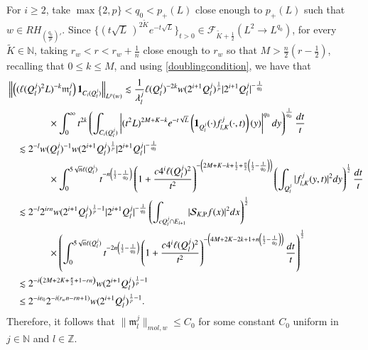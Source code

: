 \documentclass[11pt, a4paper,leqno]{amsart}
\newcommand{\mm}{\mathfrak{m}}
\renewcommand{\chi}{{\bf 1}}
\theoremstyle{plain}
\theoremstyle{definition}
\theoremstyle{remark}
\numberwithin{equation}{section}
\def \N{ \mathbb{N} }
\def \Z{ \mathbb{Z} }
\def \Scal{ \mathcal{S} }
\def \pp{ \mathrm{P} }
\begin{document}
For $i\geq 2$, take $\max\{2,p\}<q_0<p_+(L)$ close enough to $p_+(L)$ such that $w\in
RH_{\left(\frac{q_0}{p}\right)'}$. Since $\{(t\sqrt{L}\,)^{2\widetilde{K}}e^{-t\sqrt{L}}\}_{t>0}\in \mathcal{F}_{\widetilde{K}+\frac{1}{2}}(L^{2}\rightarrow L^{q_0})$, for every $\widetilde{K}\in \N$, taking $r_w<r<r_w+\frac{1}{n}$ close enough to $r_w$ so that $M>\frac{n}{2}\left(r-\frac{1}{2}\right)$, recalling that $0\leq k\leq M$, and using \eqref{doublingcondition}, we have that
 \begin{align*}
&\left\|\left((\ell(Q_l^j)^2L)^{-k}\mm_l^j\right)\chi_{C_i(Q_l^j)}
    \right\|_{L^p(w)}
 \lesssim \frac{1}{\lambda_l^j}\ell(Q_l^j)^{-2k}w(2^{i+1}Q_l^j)^{\frac{1}{p}}|2^{i+1}Q_l^j|^{-\frac{1}{q_0}}
    \\
    &\hspace*{1.5cm}\times\int_0^{\infty}t^{2k}\left(\int_{C_i(Q_l^j)}\left|(t^2L)^{2M+K-k}e^{-t\sqrt{L}}\left(\chi_{Q_l^j}(\cdot)f_{l,K}^j(\cdot,t)\right)(y)\right|^{q_0}dy\right)^{\frac{1}{q_0}}\frac{dt}{t}
    \\
  &\quad\lesssim 2^{-l}w(Q_l^j)^{-1}w(2^{i+1}Q_l^j)^{\frac{1}{p}}
  |2^{i+1}Q_l^j|^{-\frac{1}{q_0}}
    \\
    &\hspace*{1.5cm}\times\int_0^{5\sqrt{n}\ell(Q_l^j)}t^{-n\left(\frac{1}{2}-\frac{1}{q_0}\right)}\left(1+\frac{c4^i\ell(Q_l^j)^2}{t^2}\right)^{-\left(2M+K-k+\frac{1}{2}+\frac{n}{2}\left(\frac{1}{2}-\frac{1}{q_0}\right)\right)}\left(\int_{Q_l^j}|f_{l,K}^j(y,t)|^{2}dy\right)^{\frac{1}{2}}\frac{dt}{t}
    \\
   &\quad\lesssim 2^{-l}2^{irn}
    w(2^{i+1}Q_l^j)^{\frac{1}{p}-1}
    |2^{i+1}Q_l^j|^{-\frac{1}{q_0}}\left(\int_{cQ_l^j\cap E_{l+1}}
   |\Scal_{K,\pp}f(x)|^2 dx\right)^{\frac{1}{2}}
     \\
    &\hspace*{1.5cm}\times
    \left(\int_{0}^{5\sqrt{n}\ell(Q_l^j)}t^{-2n\left(\frac{1}{2}-
    \frac{1}{q_0}\right)}\left(1+\frac{c4^{i}\ell(Q_l^j)^2}{t^2}
    \right)^{-\left
    (4M+2K-2k+1+n\left(\frac{1}{2}-\frac{1}{q_0}\right)
    \right)}\frac{dt}{t}\right)^{\frac{1}{2}}
    \\
    &\quad \lesssim 2^{-i\left(2M+2K+\frac{n}{2}+1-rn
    \right)}w(2^{i+1}Q_l^j)^{\frac{1}{p}-1}
    \\&\quad
    \leq 2^{-i\varepsilon_0}2^{-i(r_wn-rn+1)}w(2^{i+1}Q_l^j)^{\frac{1}{p}-1}.
    \end{align*}
Therefore, it follows that $\|\mm_l^j\|_{mol,w}\leq C_0$ for some constant $C_0$ uniform  in $j\in \N$ and $l\in \Z$.
\end{document}

